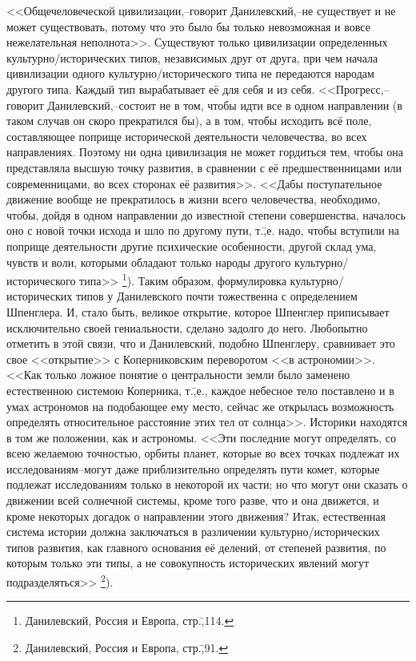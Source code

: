 <<Общечеловеческой цивилизации,\---говорит Данилевский,\---не существует и не может существовать, потому что это было бы только невозможная и вовсе нежелательная неполнота>>. Существуют только цивилизации определенных культурно\-/исторических типов, независимых друг от друга, при чем начала цивилизации одного культурно\-/исторического типа не передаются народам другого типа. Каждый тип вырабатывает её для себя и из себя. <<Прогресс,\---говорит Данилевский,\---состоит не в том, чтобы идти все в одном направлении (в таком случав он скоро прекратился бы), а в том, чтобы исходить всё поле, составляющее поприще исторической деятельности человечества, во всех направлениях. Поэтому ни одна цивилизация не может гордиться тем, чтобы она представляла высшую точку развития, в сравнении с её предшественницами или современницами, во всех сторонах её развития>>. <<Дабы поступательное движение вообще не прекратилось в жизни всего человечества, необходимо, чтобы, дойдя в одном направлении до известной степени совершенства, началось оно с новой точки исхода и шло по другому пути, т.\=,е. надо, чтобы вступили на поприще деятельности другие психические особенности, другой склад ума, чувств и воли, которыми обладают только народы другого культурно\-/исторического типа>> \footnote{Данилевский, Россия и Европа, стр.\=,114.}). Таким образом, формулировка культурно\-/исторических типов у Данилевского почти тожественна с определением Шпенглера. И, стало быть, великое открытие, которое Шпенглер приписывает исключительно своей гениальности, сделано задолго до него. Любопытно отметить в этой связи, что и Данилевский, подобно Шпенглеру, сравнивает это свое <<открытие>> с Коперниковским переворотом <<в астрономии>>. <<Как только ложное понятие о центральности земли было заменено естественною системою Коперника, т.\=,е., каждое небесное тело поставлено и в умах астрономов на подобающее ему место, сейчас же открылась возможность определять относительное расстояние этих тел от солнца>>. Историки находятся в том же положении, как и астрономы. <<Эти последние могут определять, со всею желаемою точностью, орбиты планет, которые во всех точках подлежат их исследованиям\---могут даже приблизительно определять пути комет, которые подлежат исследованиям только в некоторой их части; но что могут они сказать о движении всей солнечной системы, кроме того разве, что и она движется, и кроме некоторых догадок о направлении этого движения? Итак, естественная система истории должна заключаться в различении культурно\-/исторических типов развития, как главного основания её делений, от степеней развития, по которым только эти типы, а не совокупность исторических явлений могут подразделяться>> \footnote{Данилевский, Россия и Европа, стр.\=,91.}).

